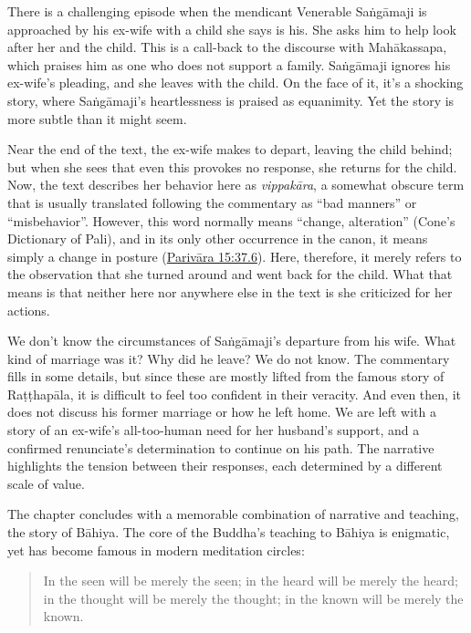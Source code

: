\documentclass[12pt,openany]{book}%
\begin{document}
There is a challenging episode when the mendicant Venerable \textsanskrit{Saṅgāmaji} is approached by his ex-wife with a child she says is his. She asks him to help look after her and the child. This is a call-back to the discourse with \textsanskrit{Mahākassapa}, which praises him as one who does not support a family. \textsanskrit{Saṅgāmaji} ignores his ex-wife’s pleading, and she leaves with the child. On the face of it, it’s a shocking story, where \textsanskrit{Saṅgāmaji}’s heartlessness is praised as equanimity. Yet the story is more subtle than it might seem. 

Near the end of the text, the ex-wife makes to depart, leaving the child behind; but when she sees that even this provokes no response, she returns for the child. Now, the text describes her behavior here as \textit{\textsanskrit{vippakāra}}, a somewhat obscure term that is usually translated following the commentary as “bad manners” or “misbehavior”. However, this word normally means “change, alteration” (Cone’s Dictionary of Pali), and in its only other occurrence in the canon, it means simply a change in posture (\href{https://suttacentral.net/pli-tv-pvr15/en/brahmali\#37.6}{Parivāra 15:37.6}). Here, therefore, it merely refers to the observation that she turned around and went back for the child. What that means is that neither here nor anywhere else in the text is she criticized for her actions.

We don’t know the circumstances of \textsanskrit{Saṅgāmaji}’s departure from his wife. What kind of marriage was it? Why did he leave? We do not know. The commentary fills in some details, but since these are mostly lifted from the famous story of \textsanskrit{Raṭṭhapāla}, it is difficult to feel too confident in their veracity. And even then, it does not discuss his former marriage or how he left home. We are left with a story of an ex-wife’s all-too-human need for her husband’s support, and a confirmed renunciate’s determination to continue on his path. The narrative highlights the tension between their responses, each determined by a different scale of value. 

The chapter concludes with a memorable combination of narrative and teaching, the story of \textsanskrit{Bāhiya}. The core of the Buddha’s teaching to \textsanskrit{Bāhiya} is enigmatic, yet has become famous in modern meditation circles:

\begin{quotation}%
In the seen will be merely the seen; in the heard will be merely the heard; in the thought will be merely the thought; in the known will be merely the known.

%
\end{quotation}
\end{document}
